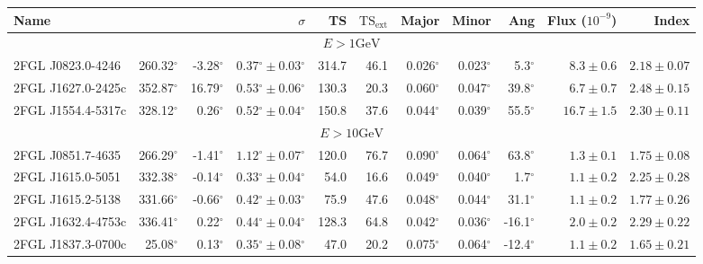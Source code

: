 \documentclass[12pt,preprint]{aastex}
\newcommand{\gev}{\text{GeV}\xspace}
\newcommand{\tsext}{{\ensuremath{\text{TS}_\text{ext}}}\xspace}
\newcommand{\glon}{\text{GLON}\xspace}
\newcommand{\glat}{\text{GLAT}\xspace}
\renewcommand{\deg}{\ensuremath{^\circ}\xspace}
\begin{document}
\clearpage
\begin{table}
  \begin{centering}
    \begin{tabular}{l|rrrrrrrrrr}
      \hline
      \hline
      Name                 &          \glon &          \glat &                    $\sigma$ &         TS &   $\tsext$ &      Major &      Minor &        Ang &      Flux ($10^{-9}$) &                 Index \\
      \hline
      \multicolumn{11}{c}{$E > 1 \gev$} \\
      \hline
      2FGL J0823.0-4246    &     260.32\deg &      -3.28\deg & $  0.37\deg \pm   0.03\deg$ &      314.7 &       46.1 &  0.026\deg &  0.023\deg &    5.3\deg & $    8.3 \pm     0.6$ & $   2.18 \pm    0.07$ \\
      2FGL J1627.0-2425c   &     352.87\deg &      16.79\deg & $  0.53\deg \pm   0.06\deg$ &      130.3 &       20.3 &  0.060\deg &  0.047\deg &   39.8\deg & $    6.7 \pm     0.7$ & $   2.48 \pm    0.15$ \\
      2FGL J1554.4-5317c   &     328.12\deg &       0.26\deg & $  0.52\deg \pm   0.04\deg$ &      150.8 &       37.6 &  0.044\deg &  0.039\deg &   55.5\deg & $   16.7 \pm     1.5$ & $   2.30 \pm    0.11$ \\
      \hline
      \multicolumn{11}{c}{$E > 10 \gev$} \\
      \hline
      2FGL J0851.7-4635    &     266.29\deg &      -1.41\deg & $  1.12\deg \pm   0.07\deg$ &      120.0 &       76.7 &  0.090\deg &  0.064\deg &   63.8\deg & $    1.3 \pm     0.1$ & $   1.75 \pm    0.08$ \\
      2FGL J1615.0-5051    &     332.38\deg &      -0.14\deg & $  0.33\deg \pm   0.04\deg$ &       54.0 &       16.6 &  0.049\deg &  0.040\deg &    1.7\deg & $    1.1 \pm     0.2$ & $   2.25 \pm    0.28$ \\
      2FGL J1615.2-5138    &     331.66\deg &      -0.66\deg & $  0.42\deg \pm   0.03\deg$ &       75.9 &       47.6 &  0.048\deg &  0.044\deg &   31.1\deg & $    1.1 \pm     0.2$ & $   1.77 \pm    0.26$ \\
      2FGL J1632.4-4753c   &     336.41\deg &       0.22\deg & $  0.44\deg \pm   0.04\deg$ &      128.3 &       64.8 &  0.042\deg &  0.036\deg &  -16.1\deg & $    2.0 \pm     0.2$ & $   2.29 \pm    0.22$ \\
      2FGL J1837.3-0700c   &      25.08\deg &       0.13\deg & $  0.35\deg \pm   0.08\deg$ &       47.0 &       20.2 &  0.075\deg &  0.064\deg &  -12.4\deg & $    1.1 \pm     0.2$ & $   1.65 \pm    0.21$ \\

\end{tabular}
\end{centering}
\end{table}
\end{document}
